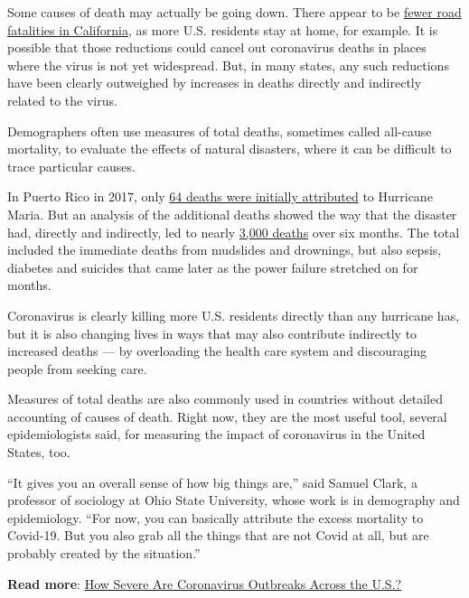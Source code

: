 Some causes of death may actually be going down. There appear to be
\href{https://roadecology.ucdavis.edu/files/content/projects/COVID_CHIPs_Impacts_updated_415.pdf}{fewer
road fatalities in California}, as more U.S. residents stay at home, for
example. It is possible that those reductions could cancel out
coronavirus deaths in places where the virus is not yet widespread. But,
in many states, any such reductions have been clearly outweighed by
increases in deaths directly and indirectly related to the virus.

Demographers often use measures of total deaths, sometimes called
all-cause mortality, to evaluate the effects of natural disasters, where
it can be difficult to trace particular causes.

In Puerto Rico in 2017, only
\href{https://www.nytimes.com/2018/08/28/us/puerto-rico-hurricane-maria-deaths.html}{64
deaths were initially attributed} to Hurricane Maria. But an analysis of
the additional deaths showed the way that the disaster had, directly and
indirectly, led to nearly
\href{https://prstudy.publichealth.gwu.edu/sites/prstudy.publichealth.gwu.edu/files/reports/Acertainment\%20of\%20the\%20Estimated\%20Excess\%20Mortality\%20from\%20Hurricane\%20Maria\%20in\%20Puerto\%20Rico.pdf}{3,000
deaths} over six months. The total included the immediate deaths from
mudslides and drownings, but also sepsis, diabetes and suicides that
came later as the power failure stretched on for months.

Coronavirus is clearly killing more U.S. residents directly than any
hurricane has, but it is also changing lives in ways that may also
contribute indirectly to increased deaths --- by overloading the health
care system and discouraging people from seeking care.

Measures of total deaths are also commonly used in countries without
detailed accounting of causes of death. Right now, they are the most
useful tool, several epidemiologists said, for measuring the impact of
coronavirus in the United States, too.

``It gives you an overall sense of how big things are,'' said Samuel
Clark, a professor of sociology at Ohio State University, whose work is
in demography and epidemiology. ``For now, you can basically attribute
the excess mortality to Covid-19. But you also grab all the things that
are not Covid at all, but are probably created by the situation.''

\textbf{Read more}:
\href{https://www.nytimes.com/interactive/2020/04/03/upshot/coronavirus-metro-area-tracker.html}{How
Severe Are Coronavirus Outbreaks Across the U.S.?}

